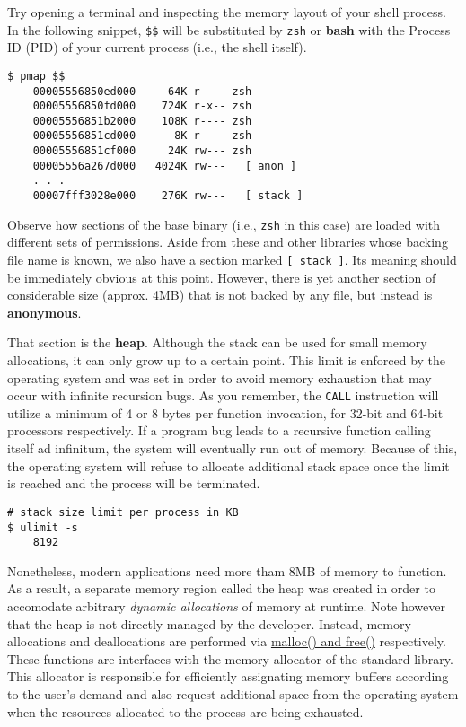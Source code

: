 Try opening a terminal and inspecting the memory layout of your shell process.
In the following snippet, \texttt{\$\$} will be substituted by \texttt{zsh} or
\textbf{bash} with the Process ID (PID) of your current process (i.e., the shell
itself).

\begin{lstlisting}[style=bashstyle]
$ pmap $$
    00005556850ed000     64K r---- zsh
    00005556850fd000    724K r-x-- zsh
    00005556851b2000    108K r---- zsh
    00005556851cd000      8K r---- zsh
    00005556851cf000     24K rw--- zsh
    00005556a267d000   4024K rw---   [ anon ]
    . . .
    00007fff3028e000    276K rw---   [ stack ]
\end{lstlisting}

Observe how sections of the base binary (i.e., \texttt{zsh} in this case) are
loaded with different sets of permissions. Aside from these and other libraries
whose backing file name is known, we also have a section marked
\texttt{[ stack ]}. Its meaning should be immediately obvious at this point.
However, there is yet another section of considerable size (approx. 4MB) that
is not backed by any file, but instead is \textbf{anonymous}.

That section is the \textbf{heap}. Although the stack can be used for small
memory allocations, it can only grow up to a certain point. This limit is
enforced by the operating system and was set in order to avoid memory
exhaustion that may occur with infinite recursion bugs. As you remember, the
\texttt{CALL} instruction will utilize a minimum of 4 or 8 bytes per function
invocation, for 32-bit and 64-bit processors respectively. If a program bug
leads to a recursive function calling itself ad infinitum, the system will
eventually run out of memory. Because of this, the operating system will refuse
to allocate additional stack space once the limit is reached and the process
will be terminated.

\begin{lstlisting}[style=bashstyle]
# stack size limit per process in KB
$ ulimit -s
    8192
\end{lstlisting}

Nonetheless, modern applications need more tham 8MB of memory to function. As
a result, a separate memory region called the heap was created in order to
accomodate arbitrary \textit{dynamic allocations} of memory at runtime. Note
however that the heap is not directly managed by the developer. Instead,
memory allocations and deallocations are performed via
\href{https://man7.org/linux/man-pages/man3/malloc.3.html}{malloc() and free()}
respectively. These functions are interfaces with the memory allocator of the
standard library. This allocator is responsible for efficiently assignating
memory buffers according to the user's demand and also request additional space
from the operating system when the resources allocated to the process are
being exhausted.

